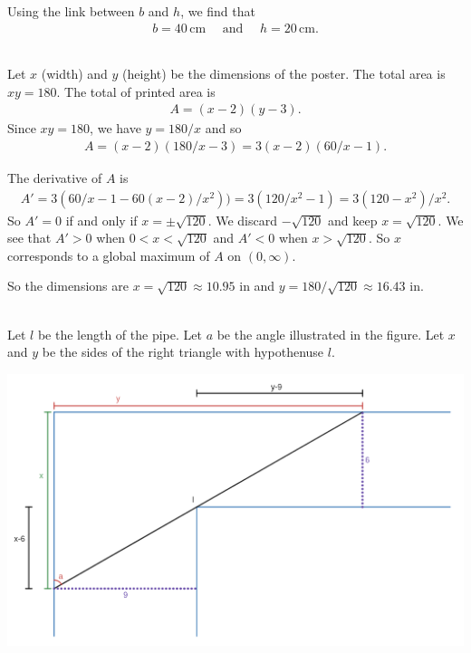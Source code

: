 	Using the link between $b$ and $h$, we find that
		\begin{align*}
		b =40\, \mathrm{cm} \quad \text{ and } \quad h = 20\,  \mathrm{cm} .
\end{align*}	

	\spc		
	
	\\
	Let $x$ (width) and $y$ (height) be the dimensions of the poster. The total area is $xy = 180$. The total of printed area is
		\begin{align*}
		A = (x - 2) (y - 3).
		\end{align*}
	Since $xy = 180$, we have $y = 180/x$ and so
		\begin{align*}
		A = (x - 2) (180/x - 3) = 3 (x - 2) (60/x - 1).
		\end{align*}
	
	The derivative of $A$ is
		\begin{align*}
		A' = 3 (60/x - 1 - 60(x - 2)/x^2)) = 3 (120/x^2 - 1) = 3 (120 - x^2)/x^2 .
		\end{align*}
	So $A' = 0$ if and only if $x = \pm \sqrt{120}$. We discard $-\sqrt{120}$ and keep $x = \sqrt{120}$. We see that $A' > 0$ when $0 < x < \sqrt{120}$ and $A' < 0$ when $x > \sqrt{120}$. So $x$ corresponds to a global maximum of $A$ on $(0, \infty )$. 
	
	So the dimensions are $x = \sqrt{120} \approx 10.95 \text{ in}$ and $y= 180/\sqrt{120} \approx 16.43 \text{ in}$. 
	
	\spc
	
	\\
	Let $l$ be the length of the pipe. Let $a$ be the angle illustrated in the figure. Let $x$ and $y$ be the sides of the right triangle with hypothenuse $l$. 
	
		\begin{center}
		\includegraphics[scale=0.3]{number74.png}
		\end{center}
		
